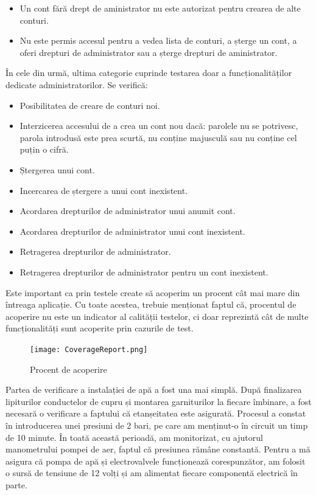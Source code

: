 	\begin{itemize}
			\setlength{\itemindent}{2em}
			\itemsep0em
			\item Un cont fără drept de aministrator nu este autorizat pentru crearea de alte conturi.
			\item Nu este permis accesul pentru a vedea lista de conturi, a șterge un cont, a oferi drepturi de administrator sau a șterge drepturi de aministrator.
	\end{itemize} 

\vspace{2em}

	În cele din urmă, ultima categorie cuprinde testarea doar a funcționalităților dedicate administratorilor. Se verifică:

	\begin{itemize}
			\setlength{\itemindent}{2em}
			\itemsep0em
			\item Posibilitatea de creare de conturi noi.
			\item Interzicerea accesului de a crea un cont nou dacă: parolele nu se potrivesc, parola introdusă este prea scurtă, nu conține majusculă sau nu conține cel puțin o cifră.
			\item Ștergerea unui cont.
			\item Incercarea de ștergere a unui cont inexistent.
			\item Acordarea drepturilor de administrator unui anumit cont.
			\item Acordarea drepturilor de administrator unui cont inexistent.
			\item Retragerea drepturilor de administrator.
			\item Retragerea drepturilor de administrator pentru un cont inexistent.
	\end{itemize} 

	Este important ca prin testele create să acoperim un procent cât mai mare din întreaga aplicație. Cu toate acestea, trebuie menționat faptul că, procentul de acoperire nu este un indicator al calității testelor, ci doar reprezintă cât de multe funcționalități sunt acoperite prin cazurile de test.

\begin{figure}[H]
	\centering
    	\texttt{[image: CoverageReport.png]}
	\caption{Procent de acoperire}
\end{figure}    

\vspace{2em}

	Partea de verificare a instalației de apă a fost una mai simplă. După finalizarea lipiturilor conductelor de cupru și montarea garniturilor la fiecare îmbinare, a fost necesară o verificare a faptului că etanșeitatea este asigurată. Procesul a constat în introducerea unei presiuni de 2 bari, pe care am menținut-o în circuit un timp de 10 minute. În toată această perioadă, am monitorizat, cu ajutorul manometrului pompei de aer, faptul că presiunea rămâne constantă. Pentru a mă asigura că pompa de apă și electrovalvele funcționează corespunzător, am folosit o sursă de tensiune de 12 volți și am alimentat fiecare componentă electrică în parte. 


	